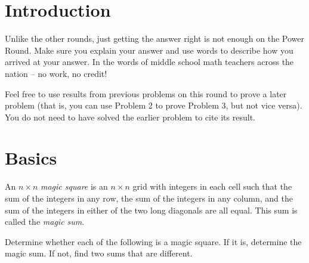 \documentclass[11pt]{article}
\renewenvironment{problem}{\begin{problems}}{\end{problems}\vspace{5pt}}
\begin{document}
\setlength{\parindent}{0pt}

\section{Introduction}

Unlike the other rounds, just getting the answer right is not enough on the Power Round. 
Make sure you explain your answer and use words to describe how you arrived at your answer. 
In the words of middle school math teachers across the nation -- no work, no credit! \newline

Feel free to use results from previous problems on this round to prove a later problem 
(that is, you can use Problem 2 to prove Problem 3, but not vice versa). 
You do not need to have solved the earlier problem to cite its result.

\section{Basics}

\begin{definition}
An $n \times n$ \textit{magic square} is an $n \times n$ grid with integers in each cell such that
the sum of the integers in any row, the sum of the integers in any column, and the sum of the integers
in either of the two long diagonals are all equal. This sum is called the \textit{magic sum}.
\end{definition}

\begin{problem}[3=1+1+1 points]
Determine whether each of the following is a magic square. If it is, determine the magic sum. If not, find two sums that are different.

\begin{figure}[H]
\centering
{}
\qquad
{}
\qquad
{}
\end{figure}
\end{problem}
\end{document}
